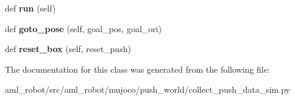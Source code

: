 \begin{DoxyCompactItemize}
\hypertarget{classaml__robot_1_1mujoco_1_1push__world_1_1collect__push__data__sim_1_1_push_machine_a45926a404a25f950d8391b0836386d1e}{}\label{classaml__robot_1_1mujoco_1_1push__world_1_1collect__push__data__sim_1_1_push_machine_a45926a404a25f950d8391b0836386d1e} 
def {\bfseries run} (self)
\item 
\hypertarget{classaml__robot_1_1mujoco_1_1push__world_1_1collect__push__data__sim_1_1_push_machine_a02156c4c741f7ee39e28d2836d26722d}{}\label{classaml__robot_1_1mujoco_1_1push__world_1_1collect__push__data__sim_1_1_push_machine_a02156c4c741f7ee39e28d2836d26722d} 
def {\bfseries goto\+\_\+pose} (self, goal\+\_\+pos, goal\+\_\+ori)
\item 
\hypertarget{classaml__robot_1_1mujoco_1_1push__world_1_1collect__push__data__sim_1_1_push_machine_a23ccbe1e6b4d2604bb08216a39f7fbec}{}\label{classaml__robot_1_1mujoco_1_1push__world_1_1collect__push__data__sim_1_1_push_machine_a23ccbe1e6b4d2604bb08216a39f7fbec} 
def {\bfseries reset\+\_\+box} (self, reset\+\_\+push)
\end{DoxyCompactItemize}


The documentation for this class was generated from the following file\+:\begin{DoxyCompactItemize}
\item 
aml\+\_\+robot/src/aml\+\_\+robot/mujoco/push\+\_\+world/collect\+\_\+push\+\_\+data\+\_\+sim.\+py\end{DoxyCompactItemize}

